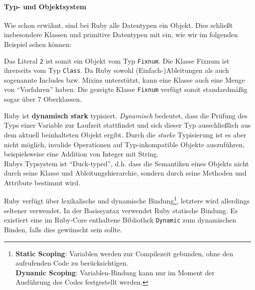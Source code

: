 \paragraph{Typ- und Objektsystem}
Wie schon erwähnt, sind bei Ruby alle Datentypen ein Objekt. Dies schließt insbesondere Klassen und primitive Datentypen mit ein, wie wir im folgenden Beispiel sehen können:
%
%
\begin{ruby}[label=IRB]

\end{ruby}

Das Literal \texttt{2} ist somit ein Objekt vom Typ \texttt{Fixnum}. Die Klasse Fixnum ist ihrerseits vom Typ \texttt{Class}. Da Ruby sowohl (Einfach-)Ableitungen als auch sogenannte Includes bzw. Mixins unterstützt, kann eine Klasse auch eine Menge von "`Vorfahren"' haben. Die gezeigte Klasse \texttt{Fixnum} verfügt somit standardmäßig sogar über 7 Oberklassen.


Ruby ist \textbf{dynamisch stark} typisiert. \textit{Dynamisch} bedeutet, dass die Prüfung des Typs einer Variable zur Laufzeit stattfindet und sich dieser Typ ausschließlich aus dem aktuell beinhalteten Objekt ergibt. Durch die \textit{starke} Typisierung ist es aber nicht möglich, invalide Operationen auf Typ-inkompatible Objekte auszuführen, beispielsweise eine Addition von Integer mit String. \\
Rubys Typsystem ist "`Duck-typed"', d.h. dass die Semantiken eines Objekts nicht durch seine Klasse und Ableitungshierarchie, sondern durch seine Methoden und Attribute bestimmt wird.

Ruby verfügt über lexikalische und dynamische Bindung\footnote{
\textbf{Static Scoping}: Variablen werden zur Compilezeit gebunden, ohne den aufrufenden Code zu berücksichtigen.\\
\textbf{Dynamic Scoping}: Variablen-Bindung kann nur im Moment der Ausführung des Codes festgestellt werden.}, letztere wird allerdings seltener verwendet. In der Basissyntax verwendet Ruby statische Bindung. Es existiert eine im Ruby-Core enthaltene Bibliothek \texttt{Dynamic} zum dynamischen Binden, falls dies gewünscht sein sollte.



